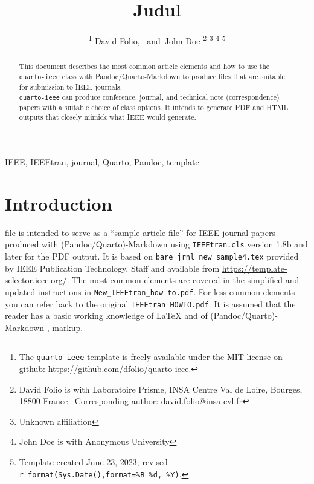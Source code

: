 \documentclass[
  journal,
]{IEEEtran}%
\title{Judul}
\author{
\thanks{The \texttt{quarto-ieee} template is freely available under the
MIT license on github: \url{https://github.com/dfolio/quarto-ieee}.}
David Folio\orcidlink{0000-0001-9430-6091},~\IEEEmembership{Member,
IEEE}
and~John Doe%
\thanks{David Folio is with Laboratoire Prisme, INSA Centre Val de
Loire, Bourges, 18800 France%
  Corresponding author: david.folio@insa-cvl.fr
}
\thanks{Unknown affiliation}
\thanks{John Doe is with Anonymous University%
}
\thanks{Template created June 23, 2023; revised
\texttt{r\ format(Sys.Date(),format=\textquotesingle{}\%B\ \%d,\ \%Y\textquotesingle{})}.}
}
\begin{document}


\maketitle

\begin{abstract}
This document describes the most common article elements and how to use
the \texttt{quarto-ieee} class with Pandoc/Quarto-Markdown to produce
files that are suitable for submission to IEEE journals.\\
\texttt{quarto-ieee} can produce conference, journal, and technical note
(correspondence) papers with a suitable choice of class options. It
intends to generate PDF and HTML outputs that closely mimick what IEEE
would generate.
\end{abstract}
\begin{IEEEkeywords}
IEEE, IEEEtran, journal, Quarto, Pandoc, template
\end{IEEEkeywords}

%


\section{Introduction}\label{sec-intro}

 file is intended to serve as a ``sample article
file'' for IEEE journal papers produced with (Pandoc/Quarto)-Markdown
using \texttt{IEEEtran.cls} version 1.8b and later for the PDF output.
It is based on \texttt{bare\_jrnl\_new\_sample4.tex} provided by IEEE
Publication Technology, Staff and available from
\url{https://template-selector.ieee.org/}. The most common elements are
covered in the simplified and updated instructions in
\texttt{New\_IEEEtran\_how-to.pdf}. For less common elements you can
refer back to the original \texttt{IEEEtran\_HOWTO.pdf}. It is assumed
that the reader has a basic working knowledge of {\LaTeX}
 and of
(Pandoc/Quarto)-Markdown ,
 markup.
\end{document}
